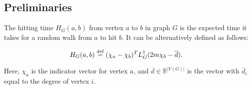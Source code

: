 \subsection{Preliminaries}
\begin{definition} The hitting time $H_G(a,b)$ from vertex $a$ to
$b$ in graph $G$ is the expected time it takes for a random walk
from $a$ to hit $b$. It can be alternatively defined as follows:

\[ H_G(a,b) \stackrel{\textup{def}}{=} (\chi_a - \chi_b)^T L_G^\dag (2m \chi_b
    -\overline{d}).\]

Here, $\chi_a$ is the indicator vector for vertex $a$, and
$\overline{d} \in \mathbb{R}^{|V(G)|}$ is the
vector with $\overline{d}_i$ equal to the degree of vertex $i$.
\end{definition}
